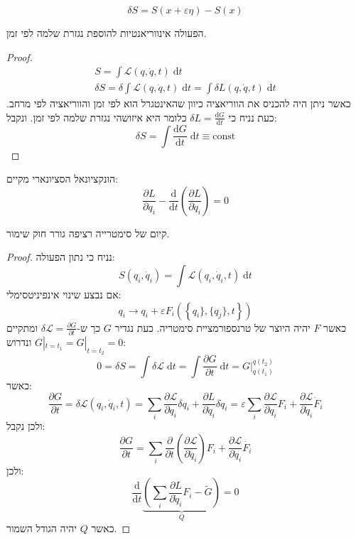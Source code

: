 \documentclass{tstextbook}
\begin{document}
\begin{definition}[ווריאציה]
$$\delta S=S\left( x+\varepsilon \eta \right)-S(x)$$

\end{definition}
\begin{proposition}
הפעולה אינווריאנטיות להוספת נגזרת שלמה לפי זמן.

\end{proposition}
\begin{proof}
$$\begin{gather}S=\int \mathcal{L}\left( q,\dot{q}, t \right) \;\mathrm{d} t  \\\delta S = \delta\int \mathcal{L}\left( q,\dot{q} ,t\right) \;\mathrm{d} t= \int \delta L\left( q,\dot{q},t \right)  \;\mathrm{d} t 
\end{gather} $$
כאשר ניתן היה להכניס את הווריאציה כיוון שהאינטגרל הוא לפי זמן והווריאציה לפי מרחב.
כעת נניח כי \(\delta L = \frac{\mathrm{d} G}{\mathrm{d} t}\) כלומר היא איזושהי נגזרת שלמה לפי זמן. ונקבל:
$$\delta S = \int \frac{\mathrm{d} G}{\mathrm{d} t}  \;\mathrm{d} t \equiv \text{const} $$

\end{proof}
\begin{reminder}
הונקציונאל הסציונארי מקיים:
$$\frac{\partial L}{\partial q_{i}}-\frac{\mathrm{d}}{\mathrm{d}t}\left( \frac{\partial L}{\partial \dot{q}_{i}}  \right)=0$$

\end{reminder}
\begin{theorem}[נטר]
קיום של סימטרייה רציפה גורר חוק שימור.

\end{theorem}
\begin{proof}
נניח כי נתון הפעולה:
$$S\left( q_{i},\dot{q}_{i} \right)=\int \mathcal{L}\left( q_{i},\dot{q}_{i},t \right)\;\mathrm{d}t$$
אם נבצע שינוי אינפיניטסימלי:
$$q_{i}\to q_{i}+\varepsilon F_{i}\left( \left\{  q_{i} \},\{ q_{j} \},t  \right\} \right)$$
כאשר \(F\) יהיה היוצר של טרנספורמציית סימטריה. כעת נגדיר \(G\) כך ש-\(\delta \mathcal{L}=\frac{\partial G}{\partial t}\) ומתקיים \(G|_{t=t_{1}}=G|_{t=t_{2}}=0\) ונדרוש:
$$0=\delta S = \int \delta \mathcal{L}\;\mathrm{d}t=\int\frac{\partial G}{\partial t} \;\mathrm{d}t = G|_{q(t_{1})}^{q(t_{2})}$$
כאשר:
$$\frac{\partial G}{\partial t} = \delta \mathcal{L}\left( q_{i},\dot{q}_{i},t \right)=\sum_{i}\frac{\partial \mathcal{L}}{\partial q_{i}} \delta q_{i}+\frac{\partial L}{\partial \dot{q}_{i}} \delta \dot{q}_{i}=\varepsilon \sum_{i}\frac{\partial \mathcal{L}}{\partial q_{i}} F_{i}+\frac{\partial \mathcal{L}}{\partial \dot{q}_{i}} \dot{F}_{i}$$
ולכן נקבל:
$$\frac{\partial G}{\partial t} =\sum_{i}\frac{\partial }{\partial t} \left( \frac{\partial \mathcal{L} }{\partial \dot{q}_{i}}  \right) F_{i}+\frac{\partial \mathcal{L}}{\partial \dot{q}_{i}}\dot{F_{i}} $$
ולכן:
$$\frac{\mathrm{d} }{\mathrm{d} t} \underbrace{ \left( \sum_{i} \frac{\partial L}{\partial \dot{q}_{i}} F_{i}-\tilde{G} \right) }_{ Q }=0$$
כאשר \(Q\) יהיה הגודל השמור.

\end{proof}
\end{document}
